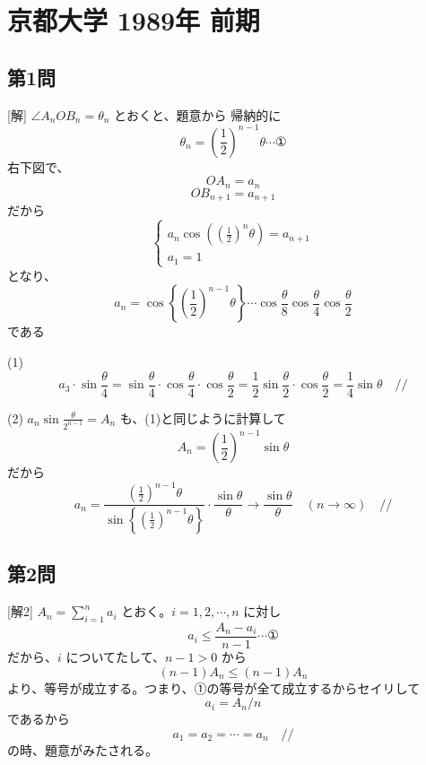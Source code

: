 \documentclass[../main.tex]{subfiles}
\begin{document}
\section*{京都大学 1989年 前期}

\subsection*{第1問}
[解] $\angle A_n O B_n = \theta_n$ とおくと、題意から
帰納的に
\[ \theta_n = \left(\frac{1}{2}\right)^{n-1} \theta \cdots \text{①} \]
右下図で、
\[ OA_n = a_n \]
\[ OB_{n+1} = a_{n+1} \]
だから
\[
  \begin{cases} a_n \cos\left(\left(\frac{1}{2}\right)^n \theta\right) = a_{n+1} \\ a_1 = 1
\end{cases} \]
となり、
\[ a_n = \cos\left\{ \left(\frac{1}{2}\right)^{n-1} \theta \right\} \cdots \cos\frac{\theta}{8} \cos\frac{\theta}{4} \cos\frac{\theta}{2} \]
である

(1)
\[ a_3 \cdot \sin\frac{\theta}{4} = \sin\frac{\theta}{4} \cdot \cos\frac{\theta}{4} \cdot \cos\frac{\theta}{2} = \frac{1}{2} \sin\frac{\theta}{2} \cdot \cos\frac{\theta}{2} = \frac{1}{4} \sin\theta \quad \text{//} \]

(2) $a_n \sin\frac{\theta}{2^{n-1}} = A_n$ も、(1)と同じように計算して
\[ A_n = \left(\frac{1}{2}\right)^{n-1} \sin\theta \]
だから
\[ a_n = \frac{ \left(\frac{1}{2}\right)^{n-1} \theta }{ \sin\left\{ \left(\frac{1}{2}\right)^{n-1} \theta \right\} } \cdot \frac{\sin\theta}{\theta} \to \frac{\sin\theta}{\theta} \quad (n \to \infty) \quad \text{//} \]

\begin{center}
\end{center}

\subsection*{第2問}
[解2] $A_n = \sum_{i=1}^n a_i$ とおく。$i=1,2,\cdots,n$ に対し
\[ a_i \le \frac{A_n - a_i}{n-1} \cdots \text{①} \]
だから、$i$ についてたして、$n-1 > 0$ から
\[ (n-1)A_n \le (n-1)A_n \]
より、等号が成立する。つまり、①の等号が全て成立するからセイリして
\[ a_i = A_n / n \]
であるから
\[ a_1 = a_2 = \cdots = a_n \quad \text{//} \]
の時、題意がみたされる。
\end{document}
